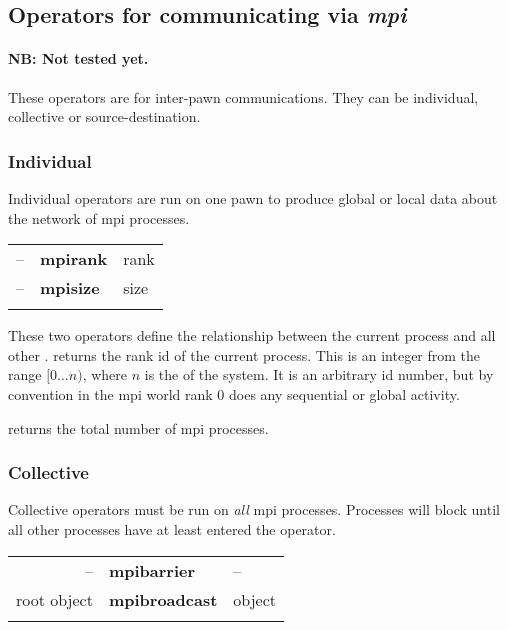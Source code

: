 \subsection{Operators for communicating via \emph{mpi}}

\paragraph{NB: Not tested yet.} These operators are for inter-pawn
communications. They can be individual, collective or
source-destination.

\subsubsection{Individual}

Individual operators are run on one pawn to produce global or local
data about the network of mpi processes.

\begin{tabular}{>{\sffamily}r>{\sffamily\bfseries}l>{\sffamily}l}
-- & mpirank & rank\\
-- & mpisize & size\\\\
\end{tabular}


These two operators define the relationship between the current
process and all other .
 returns the rank id of the current process. This is an
integer from the range $[0\ldots n)$, where $n$ is the 
of the system. It is an arbitrary id number, but by convention in the
mpi world rank $0$ does any sequential or global activity.

 returns the total number of mpi processes.

\subsubsection{Collective}

Collective operators must be run on \emph{all} mpi
processes. Processes will block until all other processes have at
least entered the operator.

\begin{tabular}{>{\sffamily}r>{\sffamily\bfseries}l>{\sffamily}l}
-- & mpibarrier & --\\
root object & mpibroadcast & object\\\\
\end{tabular}

